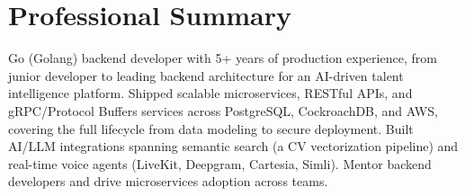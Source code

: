 \documentclass[11pt,a4paper,sans]{moderncv}
\begin{document}
\makecvtitle


\section{Professional Summary}
\vspace{1pt}
\small{Go (Golang) backend developer with 5+ years of production experience, from junior developer to leading backend architecture for an AI-driven talent intelligence platform. Shipped scalable microservices, RESTful APIs, and gRPC/Protocol Buffers services across PostgreSQL, CockroachDB, and AWS, covering the full lifecycle from data modeling to secure deployment. Built AI/LLM integrations spanning semantic search (a CV vectorization pipeline) and real-time voice agents (LiveKit, Deepgram, Cartesia, Simli). Mentor backend developers and drive microservices adoption across teams.}

\end{document}
